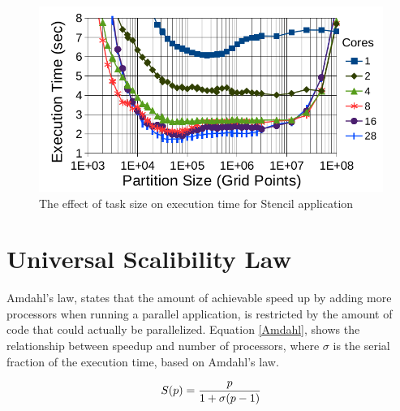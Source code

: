 \vspace{\baselineskip}
\begin{figure}[H]
	\centering
	\includegraphics[scale=0.6]{images/task_granularity.png}
	\caption{The effect of task size on execution time for Stencil application \cite{grubel2015performance}}	
	\label{fig_task_gran}
\end{figure}




\vspace{\baselineskip}
\section{Universal Scalibility Law}
Amdahl's law\cite{amdahl1967validity}, states that the amount of achievable speed up by adding more processors when running a parallel application, is restricted by the amount of code that could actually be parallelized. 
Equation \ref{Amdahl}, shows the relationship between speedup and number of processors, where $\sigma$ is the serial fraction of the execution time, based on Amdahl's law\cite{gunther2007guerrilla}. 

\begin{equation}\label{Amdahl}
S(p) = \frac{p}{1+\sigma(p-1)}\\
\end{equation}

